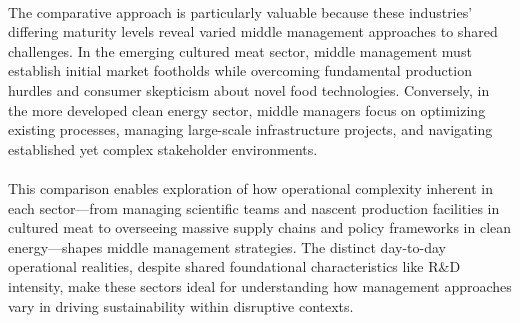 	\paragraph*{} The comparative approach is particularly valuable because these industries’ differing maturity levels reveal varied middle management approaches to shared challenges. In the emerging cultured meat sector, middle management must establish initial market footholds while overcoming fundamental production hurdles and consumer skepticism about novel food technologies. Conversely, in the more developed clean energy sector, middle managers focus on optimizing existing processes, managing large-scale infrastructure projects, and navigating established yet complex stakeholder environments.
	
	\paragraph*{} This comparison enables exploration of how operational complexity inherent in each sector—from managing scientific teams and nascent production facilities in cultured meat to overseeing massive supply chains and policy frameworks in clean energy—shapes middle management strategies. The distinct day-to-day operational realities, despite shared foundational characteristics like R\&D intensity, make these sectors ideal for understanding how management approaches vary in driving sustainability within disruptive contexts.
		
